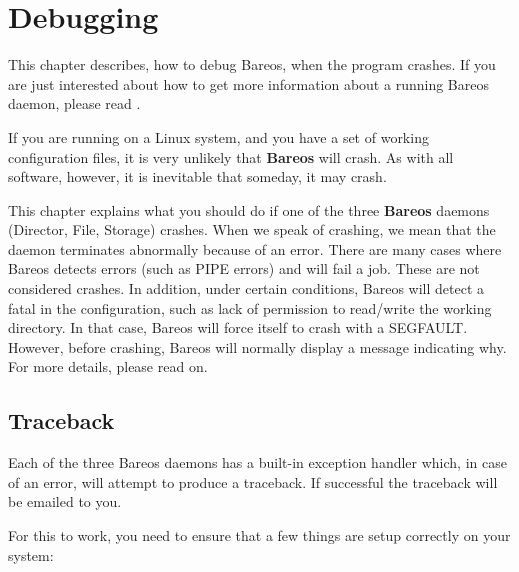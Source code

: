 \chapter{Debugging}


This chapter describes, how to debug Bareos, when the program crashes.
If you are just interested about how to get more information about a running Bareos daemon,
please read .

If you are running on a Linux system, and you have a set of working
configuration files, it is very unlikely that {\bf Bareos} will crash. As with
all software, however, it is inevitable that someday, it may crash.

This chapter explains what you should do if one of the three {\bf Bareos}
daemons (Director, File, Storage) crashes.  When we speak of crashing, we
mean that the daemon terminates abnormally because of an error.  There are
many cases where Bareos detects errors (such as PIPE errors) and will fail
a job. These are not considered crashes.  In addition, under certain
conditions, Bareos will detect a fatal in the configuration, such as
lack of permission to read/write the working directory. In that case,
Bareos will force itself to crash with a SEGFAULT. However, before
crashing, Bareos will normally display a message indicating why.
For more details, please read on.

\section{Traceback}

Each of the three Bareos daemons has a built-in exception handler which, in
case of an error, will attempt to produce a traceback. If successful the
traceback will be emailed to you.

For this to work, you need to ensure that a few things are setup correctly on
your system:

